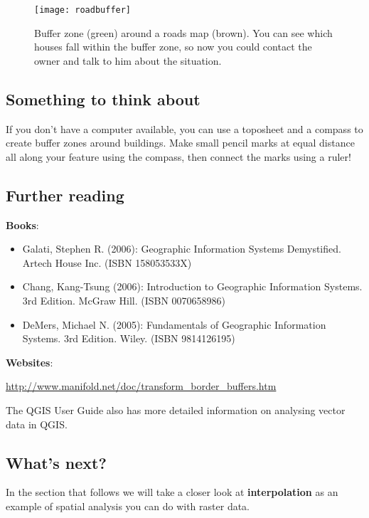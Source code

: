 \begin{figure}[ht]
   \begin{center}
   \caption{Buffer zone (green) around a roads map (brown). You can see which
houses fall within the buffer zone, so now you could contact the owner and
talk to him about the situation.}
\label{fig:lanebuffer}\smallskip
   \texttt{[image: roadbuffer]}
\end{center}
\end{figure}

\subsection{Something to think about}

If you don't have a computer available, you can use a toposheet and a compass
to create buffer zones around buildings. Make small pencil marks at equal
distance all along your feature using the compass, then connect the marks
using a ruler!

\subsection{Further reading}

\textbf{Books}: 

\begin{itemize}
\item Galati, Stephen R. (2006): Geographic Information Systems Demystified. Artech
House Inc. (ISBN 158053533X)
\item Chang, Kang-Tsung (2006): Introduction to Geographic Information Systems. 3rd
Edition.  McGraw Hill. (ISBN 0070658986)
\item DeMers, Michael N. (2005): Fundamentals of Geographic Information Systems.
3rd Edition. Wiley. (ISBN 9814126195)
\end{itemize}

\textbf{Websites}:
 
\url{http://www.manifold.net/doc/transform\_border_buffers.htm}

The QGIS User Guide also has more detailed information on analysing vector
data in QGIS.

\subsection{What's next?}

In the section that follows we will take a closer look at
\textbf{interpolation} as an example of spatial analysis you can do with
raster data.


